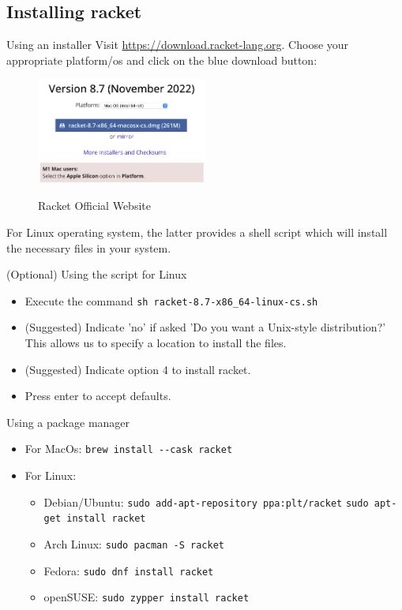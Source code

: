 \subsection{Installing racket}

\begin{frame}[fragile]{Using an installer}
  Visit \url{https://download.racket-lang.org}. Choose your appropriate
  platform/os and click on the blue download button:

\begin{figure}[htpb]
  \centering
  \href{https://download.racket-lang.org}{\includegraphics[width=0.5\textwidth]{./figures/official-website_racket.png}}
  \caption{Racket Official Website}
\end{figure}

For Linux operating system, the latter provides a shell script which will
install the necessary files in your system.

\end{frame}

\begin{frame}[fragile]{(Optional) Using the script for Linux}
  \begin{itemize}
  \item Execute the command \verb|sh racket-8.7-x86_64-linux-cs.sh|
  \item (Suggested) Indicate 'no' if asked 'Do you want a Unix-style
    distribution?' This allows us to specify a location to install the files.
  \item (Suggested) Indicate option 4 to install racket.
  \item Press enter to accept defaults.
  \end{itemize}
  
\end{frame}

\begin{frame}[fragile]{Using a package manager}
  \begin{itemize}
  \item For MacOs: \verb|brew install --cask racket|
  \item For Linux:
    \begin{itemize}
    \item Debian/Ubuntu:
      \verb|sudo add-apt-repository ppa:plt/racket|
      \verb|sudo apt-get install racket|
    \item Arch Linux: \verb|sudo pacman -S racket|
    \item Fedora: \verb|sudo dnf install racket|
    \item openSUSE: \verb|sudo zypper install racket|
    \end{itemize}
  \end{itemize}
\end{frame}